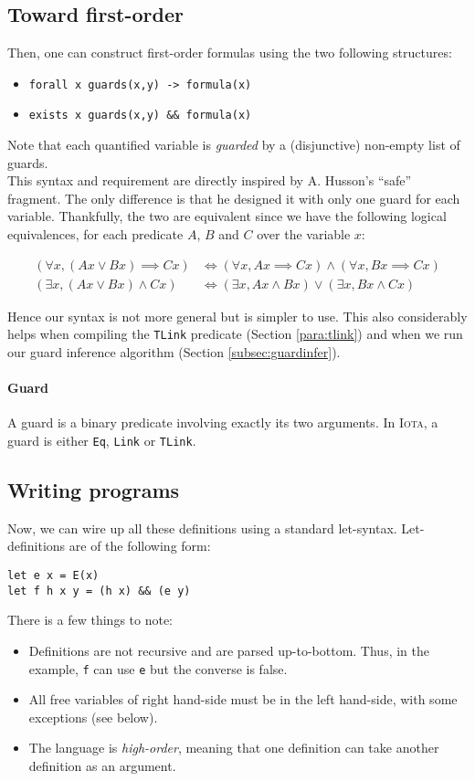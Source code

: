 \documentclass[10pt,a4paper]{article}
\newcommand\Iota{\textsc{Iota}}
\newcommand{\ocaml}{\texttt}
\begin{document}
\subsection{Toward first-order}
Then, one can construct first-order formulas using the two following structures:
\begin{itemize}
\item \ocaml{forall x guards(x,y) -> formula(x)}
\item \ocaml{exists x guards(x,y) && formula(x)}
\end{itemize}
Note that each quantified variable is \emph{guarded} by a (disjunctive) non-empty list of guards.\\
This syntax and requirement are directly inspired by A. Husson's ``safe'' fragment. The only difference is that he designed it with only one guard for each variable. Thankfully, the two are equivalent since we have the following logical equivalences, for each predicate $A$, $B$ and $C$ over the variable $x$:

\begin{align*}
  (\forall x, (A x \lor B x) \implies C x) &\iff (\forall x, A x \implies C x) \land (\forall x, B x \implies C x)\\
  (\exists x, (A x \lor B x ) \land C x) &\iff (\exists x, A x \land B x) \lor (\exists x, B x \land C x)
\end{align*}

Hence our syntax is not more general but is simpler to use. This also considerably helps when compiling the \ocaml{TLink} predicate (Section \ref{para:tlink}) and when we run our guard inference algorithm (Section \ref{subsec:guardinfer}).

\paragraph{Guard}
A guard is a binary predicate involving exactly its two arguments. In \Iota{}, a guard is either \ocaml{Eq}, \ocaml{Link} or \ocaml{TLink}.

\subsection{Writing programs}
Now, we can wire up all these definitions using a standard let-syntax. Let-definitions are of the following form:
\begin{verbatim}
let e x = E(x)
let f h x y = (h x) && (e y)
\end{verbatim}
There is a few things to note:
\begin{itemize}
\item Definitions are not recursive and are parsed up-to-bottom. Thus, in the example, \ocaml{f} can use \ocaml{e} but the converse is false.
\item All free variables of right hand-side must be in the left hand-side, with some exceptions (see below).
\item The language is \emph{high-order}, meaning that one definition can take another definition as an argument.
\end{itemize}
\end{document}
